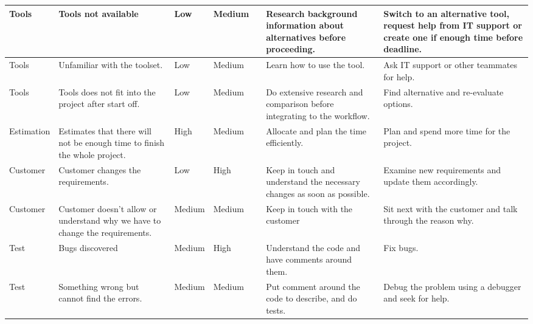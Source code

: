 \begin{longtable}{|l|p{5cm}|l|l|l|p{4cm}|p{5cm}|}
	Tools & Tools not available & Low & Medium & \low & Research background information about alternatives before proceeding. & Switch to an alternative tool, request help from IT support or create one if enough time before deadline. \\ \hline
	Tools & Unfamiliar with the toolset. & Low & Medium & \low & Learn how to use the tool. & Ask IT support or other teammates for help. \\ \hline
	Tools & Tools does not fit into the project after start off. & Low & Medium & \low & Do extensive research and comparison before integrating to the workflow. & Find alternative and re-evaluate options. \\ \hline
	
	Estimation & Estimates that there will not be enough time to finish the whole project. & High & Medium & \high & Allocate and plan the time efficiently. & Plan and spend more time for the project. \\ \hline
	
	Customer & Customer changes the requirements. & Low & High & \medium & Keep in touch and understand the necessary changes as soon as possible. & Examine new requirements and update them accordingly. \\ \hline
	Customer & Customer doesn't allow or understand why we have to change the requirements. & Medium & Medium & \medium & Keep in touch with the customer & Sit next with the customer and talk through the reason why. \\ \hline
	
	Test & Bugs discovered & Medium & High & \high & Understand the code and have comments around them. & Fix bugs. \\ \hline
	Test & Something wrong but cannot find the errors. & Medium & Medium & \medium & Put comment around the code to describe, and do tests. & Debug the problem using a debugger and seek for help. \\ \hline
	
\end{longtable}